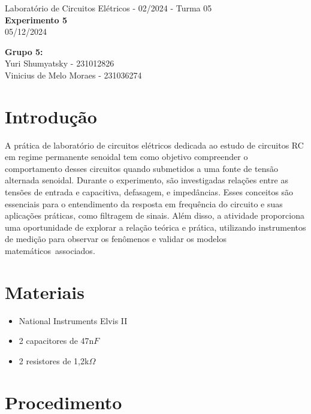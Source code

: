 \documentclass[a4 paper]{article}
\newcommand{\parag}{\hspace{30pt}}
\begin{document}
\justifying
\begin{center}{\large Laboratório de Circuitos Elétricos - 02/2024 - Turma 05}\\
{\large \textbf{Experimento 5}}\\ 
05/12/2024
\end{center}

\vspace{500pt}
 \noindent\textbf{Grupo 5:}\\
 Yuri Shumyatsky - 231012826\\
Vinicius de Melo Moraes - 231036274\\



\vspace{30pt}
\newpage

\section{Introdução}

\parag A prática de laboratório de circuitos elétricos dedicada ao estudo de circuitos RC em regime permanente senoidal tem como objetivo compreender o comportamento desses circuitos quando submetidos a uma fonte de tensão alternada senoidal. Durante o experimento, são investigadas relações entre as tensões de entrada e capacitiva, defasagem, e impedâncias. Esses conceitos são essenciais para o entendimento da resposta em frequência do circuito e suas aplicações práticas, como filtragem de sinais. Além disso, a atividade proporciona uma oportunidade de explorar a relação teórica e prática, utilizando instrumentos de medição para observar os fenômenos e validar os modelos matemáticos associados.


\vspace{5cm}
\section{Materiais}


	\begin{itemize}
	\item National Instruments Elvis II
	\item 2 capacitores de 47n$F$
	\item 2 resistores de 1,2k$\Omega$
	
	\end{itemize}

\newpage

\section{Procedimento}
\end{document}
